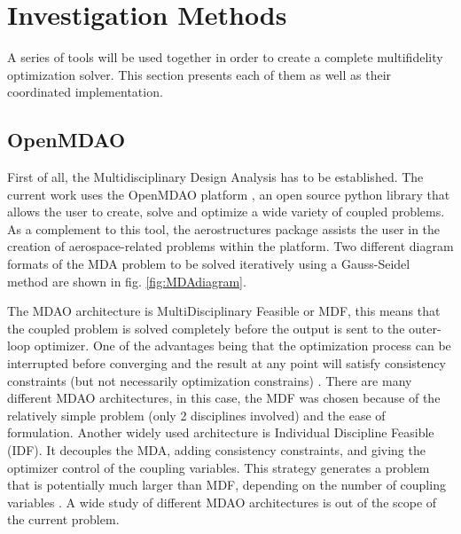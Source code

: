 \section{Investigation Methods}
\label{sec:invest_meth}
A series of tools will be used together in order to create a complete multifidelity optimization solver. This section presents each of them as well as their coordinated implementation. 
\subsection{OpenMDAO}
First of all, the Multidisciplinary Design Analysis has to be established. The current work uses the OpenMDAO platform \cite{openmdao_2019}, an open source python library that allows the user to create, solve and optimize a wide variety of coupled problems. As a complement to this tool, the aerostructures package \cite{mascolomer:tel-02023612} assists the user in the creation of aerospace-related problems within the platform. Two different diagram formats of the MDA problem to be solved iteratively using a Gauss-Seidel method are shown in fig. \ref{fig:MDAdiagram}. \par The MDAO architecture is MultiDisciplinary Feasible or MDF, this means that the coupled problem is solved completely before the output is sent to the outer-loop optimizer. One of the advantages being that the optimization process can be interrupted before converging and the result at any point will satisfy consistency constraints (but not necessarily optimization constrains) \cite{gray2013standard}. There are many different MDAO architectures, in this case, the MDF was chosen because of the relatively simple problem (only 2 disciplines involved) and the ease of formulation. Another widely used architecture is Individual Discipline Feasible (IDF). It decouples the MDA, adding consistency constraints, and giving the optimizer control  of the coupling variables. This strategy generates a problem that is potentially much larger than MDF, depending on the number of coupling variables \cite{gray2013standard}. A wide study of different MDAO architectures is out of the scope of the current problem. \par

